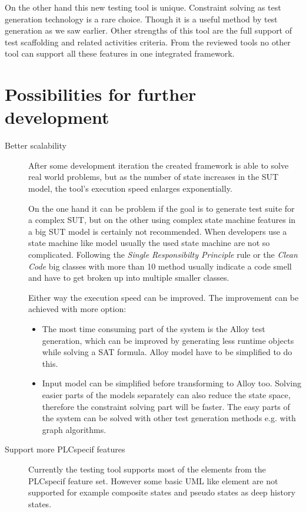 On the other hand this new testing tool is unique. Constraint solving as test generation technology is a rare choice. Though it is a useful method by test generation as we saw earlier. Other strengths of this tool are the full support of test scaffolding and related activities criteria. From the reviewed tools no other tool can support all these features in one integrated framework. 


\section{Possibilities for further development}
\label{sec:furtherdevelopment}

\begin{description}
	\item[Better scalability] After some development iteration the created framework is able to solve real world problems, but as the number of state increases in the SUT model, the tool's execution speed enlarges exponentially.
	
	On the one hand it can be problem if the goal is to generate test suite for a complex SUT, but on the other using complex state machine features in a big SUT model is certainly not recommended. When developers use a state machine like model usually the used state machine are not so complicated. Following the \textit{Single Responsibilty Principle} rule or the \textit{Clean Code} big classes with more than 10 method usually indicate a code smell and have to get broken up into multiple smaller classes.
	
	Either way the execution speed can be improved. The improvement can be achieved with more option:
	
	\begin{itemize}
		\item The most time consuming part of the system is the Alloy test generation, which can be improved by generating less runtime objects while solving a SAT formula. Alloy model have to be simplified to do this.
		\item Input model can be simplified before transforming to Alloy too. Solving easier parts of the models separately can also reduce the state space, therefore the constraint solving part will be faster. The easy parts of the system can be solved with other test generation methods e.g. with graph algorithms.
	\end{itemize}
	\item[Support more PLCspecif features] Currently the testing tool supports most of the elements from the PLCspecif feature set. However some basic UML like element are not supported for example composite states and pseudo states as deep history states.
	

\end{description}
